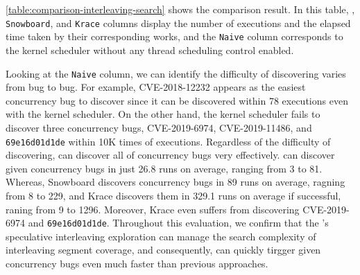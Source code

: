 


%
\autoref{table:comparison-interleaving-search} shows the comparison
result.
%
In this table, \texttt{\sys}, \texttt{Snowboard}, and \texttt{Krace}
columns display the number of executions and the elapsed time taken by
their corresponding works, and the \texttt{Naive} column corresponds
to the kernel scheduler without any thread scheduling control enabled.
%

%
Looking at the \texttt{Naive} column, we can identify the difficulty
of discovering varies from bug to bug.
%
For example, CVE-2018-12232 appears as the easiest concurrency bug to
discover since it can be discovered within 78 executions even with the
kernel scheduler.
%
On the other hand, the kernel scheduler fails to discover three
concurrency bugs, CVE-2019-6974, CVE-2019-11486, and
\texttt{69e16d01d1de} within 10K times of executions.
%
Regardless of the difficulty of discovering, \sys can discover all of
concurrency bugs very effectively.
%
\sys can discover given concurrency bugs in just 26.8 runs on average,
ranging from 3 to 81.
%
Whereas, Snowboard discovers concurrency bugs in 89 runs on average,
ragning from 8 to 229, and Krace discovers them in 329.1 runs on
average if successful, raning from 9 to 1296. Moreover, Krace even
suffers from discovering CVE-2019-6974 and \texttt{69e16d01d1de}.
%
Throughout this evaluation, we confirm that the \sys's speculative
interleaving exploration can manage the search complexity of
interleaving segment coverage, and consequently, \sys can quickly
tirgger given concurrency bugs even much faster than previous
approaches.









